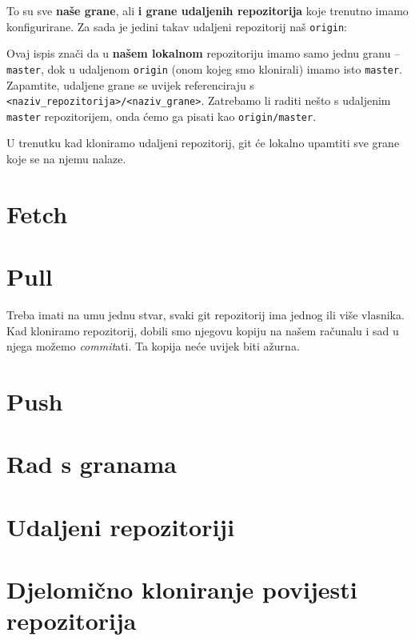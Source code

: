 To su sve \textbf{naše grane}, ali \textbf{i grane udaljenih repozitorija} koje trenutno imamo konfigurirane.
Za sada je jedini takav udaljeni repozitorij naš \verb+origin+:



Ovaj ispis znači da u \textbf{našem lokalnom} repozitoriju imamo samo jednu granu -- \verb+master+, dok u udaljenom \verb+origin+ (onom kojeg smo klonirali) imamo isto \verb+master+.
Zapamtite, udaljene grane se uvijek referenciraju s \verb+<naziv_repozitorija>/<naziv_grane>+. 
Zatrebamo li raditi nešto s udaljenim \verb+master+ repozitorijem, onda ćemo ga pisati kao \verb+origin/master+.

U trenutku kad kloniramo udaljeni repozitorij, git će lokalno upamtiti sve grane koje se na njemu nalaze.

%

\section*{Fetch}

\section*{Pull}
Treba imati na umu jednu stvar, svaki git repozitorij ima jednog ili više vlasnika.
Kad kloniramo repozitorij, dobili smo njegovu kopiju na našem računalu i sad u njega možemo \emph{commit}ati.
Ta kopija neće uvijek biti ažurna.

\section*{Push}


\section*{Rad s granama}

\section*{Udaljeni repozitoriji}

\section*{Djelomično kloniranje povijesti repozitorija}

